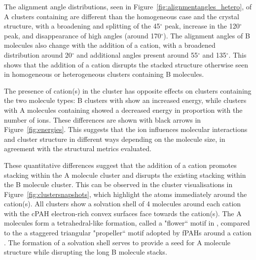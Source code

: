 The alignment angle distributions, seen in Figure~\ref{fig:alignmentangles_hetero}, of A clusters containing  are different than the homogeneous case and the crystal structure, with a broadening and splitting of the 45$^{\circ}$ peak, increase in the 120$^{\circ}$ peak, and disappearance of high angles (around 170$^{\circ}$). The alignment angles of B molecules also change with the addition of a cation, with a broadened distribution around 20$^{\circ}$ and additional angles present around 55$^{\circ}$ and 135$^{\circ}$. This shows that the addition of a cation disrupts the stacked structure otherwise seen in homogeneous or heterogeneous clusters containing B molecules. 

The presence of cation(s) in the cluster has opposite effects on clusters containing the two molecule types: B clusters with  show an increased energy, while clusters with A molecules containing  showed a decreased energy in proportion with the number of ions.  These differences are shown with black arrows in Figure~\ref{fig:energies}. This suggests that the ion influences molecular interactions and cluster structure in different ways depending on the molecule size, in agreement with the structural metrics evaluated.

These quantitative differences suggest that the addition of a cation promotes stacking within the A molecule cluster and disrupts the existing stacking within the B molecule cluster. This can be observed in the cluster visualisations in Figure~\ref{fig:clustersnapshots}, which highlight the atoms immediately around the cation(s). All clusters show a solvation shell of 4 molecules around each cation with the cPAH electron-rich convex surfaces face towards the cation(s). The A molecules form a tetrahedral-like formation, called a "flower`` motif in \citet{bowal2019ion}, compared to the a staggered triangular "propeller`` motif adopted by fPAHs around a cation \cite{bartolomei2019aggregation}. The formation of a solvation shell serves to provide a seed for A molecule structure while disrupting the long B molecule stacks.

